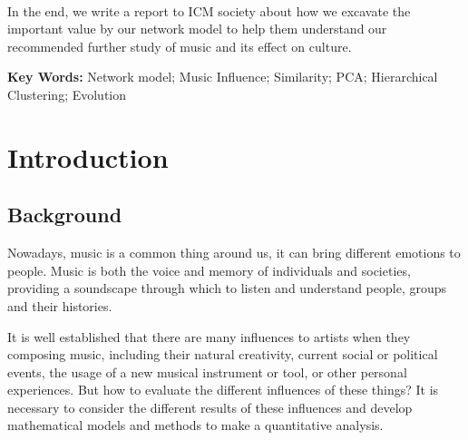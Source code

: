 \documentclass[12pt]{article}
\begin{document}
~

In the end, we write a report to ICM society about how we excavate the important value by our network model to help them understand our recommended further study of music and its effect on culture.

\textbf{Key Words:} Network model; Music Influence; Similarity; PCA; Hierarchical Clustering; Evolution




\clearpage
\pagestyle{fancy}
\newpage
\setcounter{page}{1}



\tableofcontents
\section{Introduction}
\subsection{Background}
Nowadays, music is a common thing around us, it can bring different emotions to people. Music is both the voice and memory of individuals and societies, providing a soundscape through which to listen and understand people, groups and their histories.

It is well established that there are many influences to artists when they composing music, including their natural creativity, current social or political events, the usage of a new musical instrument or tool, or other personal experiences. But how to evaluate the different influences of these things? It is necessary to consider the different results of these influences and develop mathematical models and methods to make a quantitative analysis.
\end{document}
